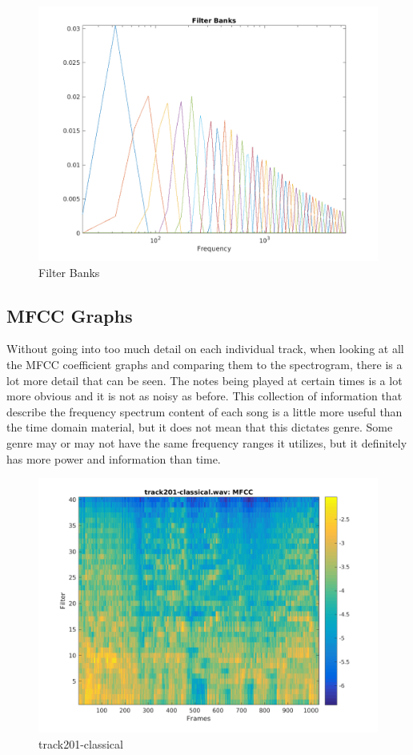 \documentclass[11pt, a4paper]{article}
\begin{document}


\begin{figure}[H]
    \centering
    \includegraphics[width=.8\textwidth]{filterbanks.png}
    \caption{Filter Banks}
\end{figure}

\subsection{MFCC Graphs}

Without going into too much detail on each individual track, when looking at all the MFCC coefficient graphs and comparing them to the spectrogram, there is a lot more detail that can be seen. The notes being played at certain times is a lot more obvious and it is not as noisy as before. This collection of information that describe the frequency spectrum content of each song is a little more useful than the time domain material, but it does not mean that this dictates genre. Some genre may or may not have the same frequency ranges it utilizes, but it definitely has more power and information than time.




\begin{figure}[H]
    \centering
    \includegraphics[width=.8\textwidth]{track201-classical-mfcc.png}
    \caption{track201-classical}
\end{figure}
\end{document}
